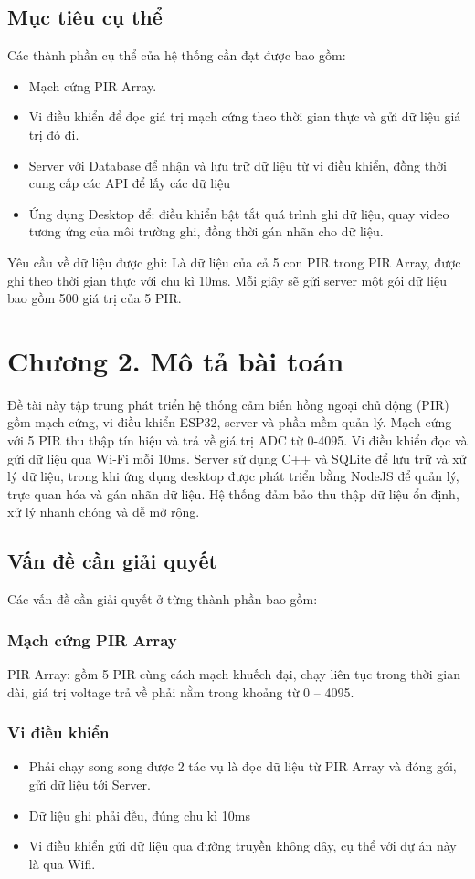 \documentclass{article}
\begin{document}
\subsection{Mục tiêu cụ thể}
Các thành phần cụ thể của hệ thống cần đạt được bao gồm: 
\begin{itemize}
    \item Mạch cứng PIR Array. 
    \item Vi điều khiển để đọc giá trị mạch cứng theo thời gian thực và gửi dữ liệu giá trị đó đi. 
    \item Server với Database để nhận và lưu trữ dữ liệu từ vi điều khiển, đồng thời cung cấp các API để lấy các dữ liệu
    \item Ứng dụng Desktop để: điều khiển bật tắt quá trình ghi dữ liệu, quay video tương ứng của môi trường ghi, đồng thời gán nhãn cho dữ liệu. 
\end{itemize}
Yêu cầu về dữ liệu được ghi: Là dữ liệu của cả 5 con PIR trong PIR Array, được ghi theo thời gian thực với chu kì 10ms. Mỗi giây sẽ gửi server một gói dữ liệu bao gồm 500 giá trị của 5  PIR. 
\cleardoublepage
\section*{Chương 2. Mô tả bài toán}
\setcounter{section}{2}
\setcounter{subsection}{0}
Đề tài này tập trung phát triển hệ thống cảm biến hồng ngoại chủ động (PIR) gồm mạch cứng, vi điều khiển ESP32, server và phần mềm quản lý. Mạch cứng với 5 PIR thu thập tín hiệu và trả về giá trị ADC từ 0-4095. Vi điều khiển đọc và gửi dữ liệu qua Wi-Fi mỗi 10ms. Server sử dụng C++ và SQLite để lưu trữ và xử lý dữ liệu, trong khi ứng dụng desktop được phát triển bằng NodeJS để quản lý, trực quan hóa và gán nhãn dữ liệu. Hệ thống đảm bảo thu thập dữ liệu ổn định, xử lý nhanh chóng và dễ mở rộng.
\subsection{Vấn đề cần giải quyết}
Các vấn đề cần giải quyết ở từng thành phần bao gồm: 
\subsubsection{Mạch cứng PIR Array }
PIR Array: gồm 5 PIR cùng cách mạch khuếch đại, chạy liên tục trong thời gian dài, giá trị voltage trả về phải nằm trong khoảng từ 0 – 4095.
\subsubsection{Vi điều khiển}
\begin{itemize}
    \item Phải chạy song song được 2 tác vụ là đọc dữ liệu từ PIR Array và đóng gói, gửi dữ liệu tới Server. 
    \item Dữ liệu ghi phải đều, đúng chu kì 10ms
    \item Vi điều khiển gửi dữ liệu qua đường truyền không dây, cụ thể với dự án này là qua Wifi. 
\end{itemize}
\end{document}
